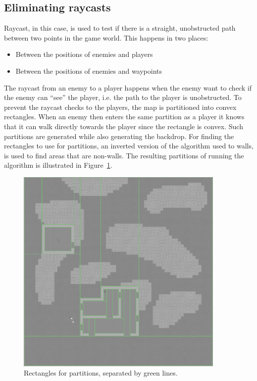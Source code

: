 \subsection*{Eliminating raycasts}
Raycast, in this case, is used to test if there is a straight, unobstructed path between two points in the game world.
This happens in two places:
\begin{itemize}
\item Between the positions of enemies and players
\item Between the positions of enemies and waypoints
\end{itemize}
The raycast from an enemy to a player happens when the enemy want to check if the enemy can ``see'' the player, i.e. the path to the player is unobstructed.
To prevent the raycast checks to the players, the map is partitioned into convex rectangles.
When an enemy then enters the same partition as a player it knows that it can walk directly towards the player since the rectangle is convex.
Such partitions are generated while also generating the backdrop.
For finding the rectangles to use for partitions, an inverted version of the algorithm used to walls, is used to find areas that are non-walls.
The resulting partitions of running the algorithm is illustrated in Figure~\ref{fig:partition_colliders_on_map}.

\begin{figure}[H]
\begin{center}
        \includegraphics[width=0.9\textwidth]{figures/generating_levels/partition_colliders.png}
    \caption{Rectangles for partitions, separated by green lines.}\label{fig:partition_colliders_on_map}
\end{center}
\end{figure}

